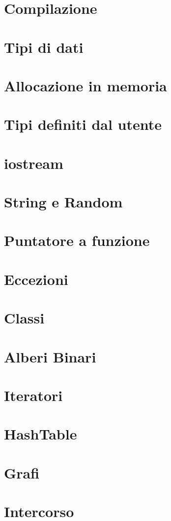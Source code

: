\documentclass{article}
\begin{document}


\newpage
\tableofcontents
\newpage
\pagestyle{fancy}
\fancyhead[L]{ }

\section{Compilazione}

\newpage
\section{Tipi di dati}

\section{Allocazione in memoria}

\section{Tipi definiti dal utente}

\section{iostream}

\newpage
\section{String e  Random}

\newpage
\section{Puntatore a funzione}

\section{Eccezioni}

\newpage
\section{Classi}

\newpage
\section{Alberi Binari}

\section{Iteratori}

\newpage
\section{HashTable}

\newpage
\section{Grafi}

\newpage
\section{Intercorso}

\end{document}
